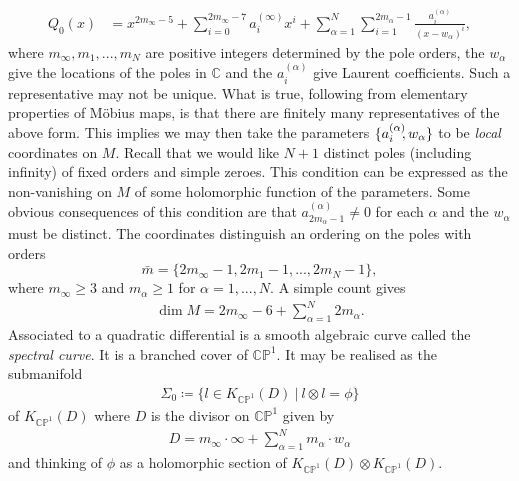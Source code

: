 \documentclass[a4paper,12pt,reqno]{amsart}
\numberwithin{equation}{section}
\numberwithin{counter2}{section}
\begin{document}
\begin{align}\label{coordinate_rep}
Q_0(x) &= x^{2m_\infty-5} + \sum_{i=0}^{2m_\infty-7} a^{(\infty)}_ix^i + \sum_{\alpha=1}^{N}\sum_{i=1}^{2m_\alpha-1}\frac{a_i^{(\alpha)}}{(x-w_\alpha)^i},
\end{align}
where $m_\infty,m_1,...,m_N$ are positive integers determined by the pole orders,  the $w_\alpha$ give the locations of the poles in $\mathbb{C}$ and the $a_i^{(\alpha)}$ give Laurent coefficients.  
 Such a representative may not be unique.  
 What is true,  following from elementary properties of M\"obius maps,  is that there are finitely many representatives of the above form.  This implies we may then take the parameters $\{a_i^{(\alpha)}\hspace{-1mm}, w_\alpha\}$ to be \textit{local} coordinates on $M$.  Recall that we would like $N+1$ distinct poles (including infinity) of fixed orders and simple zeroes.  This condition can be expressed as the non-vanishing on $M$ of some holomorphic function of the parameters.  Some obvious consequences of this condition are that $a^{(\alpha)}_{2m_\alpha-1} \ne 0$ for each $\alpha$ and the $w_\alpha$ must be distinct.  The coordinates distinguish an ordering on the poles with orders
 $$
 \bar{m} = \{2m_\infty-1,  2m_1-1, ...,2m_N-1\},  
 $$
 where $m_\infty \ge 3$ and $m_\alpha \ge 1$ for $\alpha = 1,...,N$.  
A simple count gives 
\begin{align}
\operatorname{dim} M = 2m_\infty - 6 + \sum_{\alpha=1}^{N}2m_\alpha.  
\end{align}
Associated to a quadratic differential is a smooth algebraic curve called the \textit{spectral curve}.  
It is a branched cover of $\mathbb{CP}^1$.  It may be realised as the submanifold
\begin{align}
\Sigma_0 \coloneqq \{ l \in  K_{\mathbb{CP}^1}(D) \ | \ l \otimes l = \phi\} 
\end{align}
 of $K_{\mathbb{CP}^1}(D)$ where $D$ is the divisor on $\mathbb{CP}^1$ given by 
\begin{align}
D = m_\infty \cdot \infty + \sum_{\alpha=1}^{N} m_\alpha \cdot w_\alpha
\end{align}
and thinking of $\phi$ as a holomorphic section of $K_{\mathbb{CP}^1}(D) \otimes K_{\mathbb{CP}^1}(D)$. 
\end{document}
